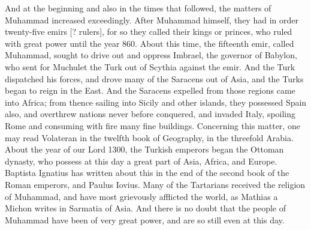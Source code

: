 And at the beginning and also in the times that followed, the matters of Muhammad increased exceedingly. After Muhammad himself, they had in order twenty-five emirs [? rulers], for so they called their kings or princes, who ruled with great power until the year 860. About this time, the fifteenth emir, called Muhammad, sought to drive out and oppress Imbrael, the governor of Babylon, who sent for Muchulet the Turk out of Scythia against the emir. And the Turk dispatched his forces, and drove many of the Saracens out of Asia, and the Turks began to reign in the East. And the Saracens expelled from those regions came into Africa; from thence sailing into Sicily and other islands, they possessed Spain also, and overthrew nations never before conquered, and invaded Italy, spoiling Rome and consuming with fire many fine buildings. Concerning this matter, one may read Volateran in the twelfth book of Geography, in the threefold Arabia. About the year of our Lord 1300, the Turkish emperors began the Ottoman dynasty, who possess at this day a great part of Asia, Africa, and Europe. Baptista Ignatius has written about this in the end of the second book of the Roman emperors, and Paulus Iovius. Many of the Tartarians received the religion of Muhammad, and have most grievously afflicted the world, as Mathias a Michon writes in Sarmatia of Asia. And there is no doubt that the people of Muhammad have been of very great power, and are so still even at this day.

